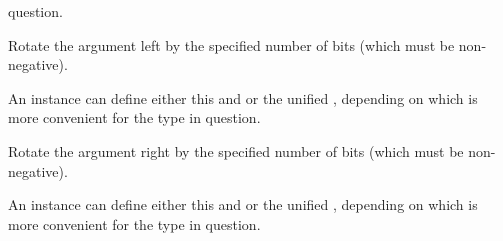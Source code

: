 \begin{haddockdesc}
{\begin{haddockdesc}
{        question. \par}
\end{haddockdesc}
\begin{haddockdesc}
\item[\begin{tabular}{@{}l}
rotateL :: a -> Int -> a
\end{tabular}]
{\haddockbegindoc
Rotate the argument left by the specified number of bits
        (which must be non-negative).\par
An instance can define either this and  or the unified
        , depending on which is more convenient for the type in
        question. \par}
\end{haddockdesc}
\begin{haddockdesc}
\item[\begin{tabular}{@{}l}
rotateR :: a -> Int -> a
\end{tabular}]
{\haddockbegindoc
Rotate the argument right by the specified number of bits
        (which must be non-negative).\par
An instance can define either this and  or the unified
        , depending on which is more convenient for the type in
        question. \par}
\end{haddockdesc}}
\end{haddockdesc}

